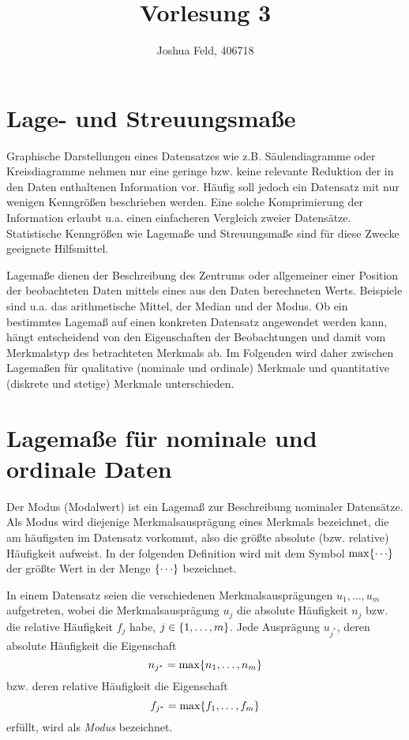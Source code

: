 \documentclass{lecture}
\institute{Institut für Statistik und Wirtschaftsmathematik}
\title{Vorlesung 3}
\author{Joshua Feld, 406718}
\begin{document}
    \maketitle


    \section*{Lage- und Streuungsmaße}

    Graphische Darstellungen eines Datensatzes wie z.B. Säulendiagramme oder Kreisdiagramme nehmen nur eine geringe bzw. keine relevante Reduktion der in den Daten enthaltenen Information vor.
    Häufig soll jedoch ein Datensatz mit nur wenigen Kenngrößen beschrieben werden.
    Eine solche Komprimierung der Information erlaubt u.a. einen einfacheren Vergleich zweier Datensätze.
    Statistische Kenngrößen wie Lagemaße und Streuungsmaße sind für diese Zwecke geeignete Hilfsmittel.

    Lagemaße dienen der Beschreibung des Zentrums oder allgemeiner einer Position der beobachteten Daten mittels eines aus den Daten berechneten Werts.
    Beispiele sind u.a. das arithmetische Mittel, der Median und der Modus.
    Ob ein bestimmtes Lagemaß auf einen konkreten Datensatz angewendet werden kann, hängt entscheidend von den Eigenschaften der Beobachtungen und damit vom Merkmalstyp des betrachteten Merkmals ab.
    Im Folgenden wird daher zwischen Lagemaßen für qualitative (nominale und ordinale) Merkmale und quantitative (diskrete und stetige) Merkmale unterschieden.


    \section*{Lagemaße für nominale und ordinale Daten}

    Der Modus (Modalwert) ist ein Lagemaß zur Beschreibung nominaler Datensätze.
    Als Modus wird diejenige Merkmalsausprägung eines Merkmals bezeichnet, die am häufigsten im Datensatz vorkommt, also die größte absolute (bzw. relative) Häufigkeit aufweist.
    In der folgenden Definition wird mit dem Symbol \(\max\braces*{\cdots}\) der größte Wert in der Menge \(\braces*{\cdots}\) bezeichnet.

    \begin{definition}
        In einem Datensatz seien die verschiedenen Merkmalsausprägungen \(u_1, \ldots, u_m\) aufgetreten, wobei die Merkmalsausprägung \(u_j\) die absolute Häufigkeit \(n_j\) bzw. die relative Häufigkeit \(f_j\) habe, \(j \in \braces*{1, \ldots, m}\).
        Jede Ausprägung \(u_{j^*}\), deren absolute Häufigkeit die Eigenschaft
        \[
            n_{j^*} = \max\braces*{n_1, \ldots, n_m}
        \]
        bzw. deren relative Häufigkeit die Eigenschaft
        \[
            f_{j^*} = \max\braces*{f_1, \ldots, f_m}
        \]
        erfüllt, wird als \emph{Modus} bezeichnet.
    \end{definition}
\end{document}
